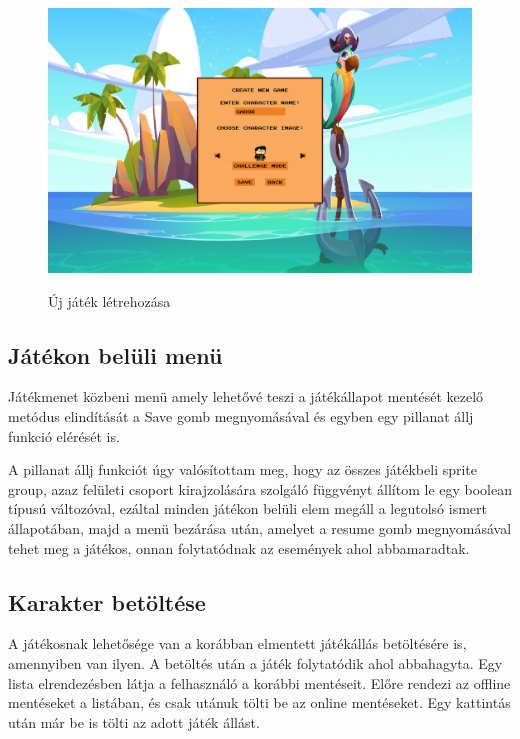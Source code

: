 \begin{figure}[H]
    \centering
    \includegraphics[width=15.0truecm]{images/newgame.png}
    \caption{Új játék létrehozása}
    \label{fig:Új játék létrehozása}\cite{NewGame}
\end{figure}

\subsection{Játékon belüli menü}

\indent \indent Játékmenet közbeni menü amely lehetővé teszi a játékállapot mentését kezelő metódus elindítását a Save gomb megnyomásával és egyben egy pillanat állj funkció elérését is. 

A pillanat állj funkciót úgy valósítottam meg, hogy az összes játékbeli sprite group, azaz felületi csoport kirajzolására szolgáló függvényt állítom le egy boolean típusú változóval, ezáltal minden játékon belüli elem megáll a legutolsó ismert állapotában, majd a menü bezárása után, amelyet a resume gomb megnyomásával tehet meg a játékos, onnan folytatódnak az események ahol abbamaradtak.


\subsection{Karakter betöltése}
\indent \indent A játékosnak lehetősége van a korábban elmentett játékállás betöltésére is, amennyiben van ilyen. A betöltés után a játék folytatódik ahol abbahagyta. Egy lista elrendezésben látja a felhasználó a korábbi mentéseit. Előre rendezi az offline mentéseket a listában, és csak utánuk tölti be az online mentéseket. Egy kattintás után már be is tölti az adott játék állást.

